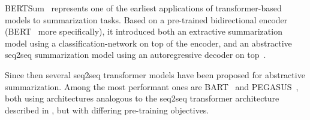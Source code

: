 BERTSum~\parencite{bertsum} represents one of the earliest applications of
transformer-based models to summarization tasks.
Based on a pre-trained bidirectional encoder (BERT~\parencite{bert} more specifically),
it introduced both an extractive summarization model using a classification-network on top of the encoder,
and an abstractive \acl{seq2seq} summarization model using an autoregressive decoder on top~\parencite[3733-3734]{bertsum}.

Since then several \ac{seq2seq} transformer models have been proposed for abstractive summarization.
Among the most performant ones are BART~\parencite{bart} and PEGASUS~\parencite{pegasus},
both using architectures analogous to the \ac{seq2seq} transformer architecture described in \parencite{transformer},
but with differing pre-training objectives.

